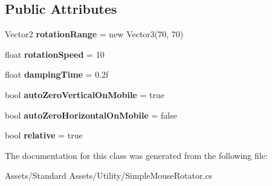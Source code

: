 \subsection*{Public Attributes}
\begin{DoxyCompactItemize}
\item 
Vector2 {\bfseries rotation\+Range} = new Vector3(70, 70)\hypertarget{class_unity_standard_assets_1_1_utility_1_1_simple_mouse_rotator_af79ed9357370019db5ce36b6915d570f}{}\label{class_unity_standard_assets_1_1_utility_1_1_simple_mouse_rotator_af79ed9357370019db5ce36b6915d570f}

\item 
float {\bfseries rotation\+Speed} = 10\hypertarget{class_unity_standard_assets_1_1_utility_1_1_simple_mouse_rotator_afc9602d14db21096a9777a6eaba4fbb5}{}\label{class_unity_standard_assets_1_1_utility_1_1_simple_mouse_rotator_afc9602d14db21096a9777a6eaba4fbb5}

\item 
float {\bfseries damping\+Time} = 0.\+2f\hypertarget{class_unity_standard_assets_1_1_utility_1_1_simple_mouse_rotator_a85aa6523ef427b26aa06e2bf72065c2a}{}\label{class_unity_standard_assets_1_1_utility_1_1_simple_mouse_rotator_a85aa6523ef427b26aa06e2bf72065c2a}

\item 
bool {\bfseries auto\+Zero\+Vertical\+On\+Mobile} = true\hypertarget{class_unity_standard_assets_1_1_utility_1_1_simple_mouse_rotator_aa760458c2ee655aaa3d0070d232e0bd8}{}\label{class_unity_standard_assets_1_1_utility_1_1_simple_mouse_rotator_aa760458c2ee655aaa3d0070d232e0bd8}

\item 
bool {\bfseries auto\+Zero\+Horizontal\+On\+Mobile} = false\hypertarget{class_unity_standard_assets_1_1_utility_1_1_simple_mouse_rotator_a2c478b280f5cc6aabd0748ff942aa70a}{}\label{class_unity_standard_assets_1_1_utility_1_1_simple_mouse_rotator_a2c478b280f5cc6aabd0748ff942aa70a}

\item 
bool {\bfseries relative} = true\hypertarget{class_unity_standard_assets_1_1_utility_1_1_simple_mouse_rotator_ae3fa7d106b4665c21827c83c0f536b6d}{}\label{class_unity_standard_assets_1_1_utility_1_1_simple_mouse_rotator_ae3fa7d106b4665c21827c83c0f536b6d}

\end{DoxyCompactItemize}


The documentation for this class was generated from the following file\+:\begin{DoxyCompactItemize}
\item 
Assets/\+Standard Assets/\+Utility/Simple\+Mouse\+Rotator.\+cs\end{DoxyCompactItemize}
